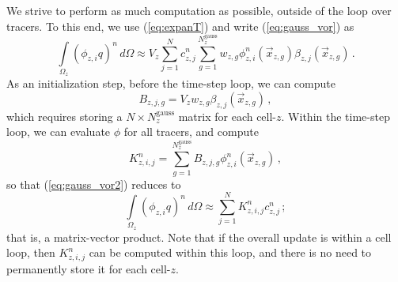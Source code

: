 \documentclass[11pt]{report}
\newcommand{\svec}[1]{{\Vec{#1}}}
\begin{document}
We strive to perform as much computation as possible, outside of the loop
over tracers.  To this end, we use (\ref{eq:expanT}) and write
(\ref{eq:gauss_vor}) as
\begin{equation}
  \label{eq:gauss_vor2}
  \int\limits_{\Omega_z} (\phi_{z,i} q)^{n} \, d\Omega \approx 
     V_z \sum_{j=1}^N c^n_{z,j} \sum_{g=1}^{N^{\mathrm{gauss}}_z}
       w_{z,g} \phi^n_{z,i}(\svec{x}_{z,g})
       \beta_{z,j}(\svec{x}_{z,g})\,.
\end{equation}
As an initialization step, before the time-step loop, we can compute
\begin{equation}
  \label{eq:bfactor}
  B_{z,j,g} = V_z w_{z,g} \beta_{z,j}(\svec{x}_{z,g})\,,
\end{equation}
which requires storing a $N \times N^{\mathrm{gauss}}_z$ matrix for each
cell-$z$.  Within the time-step loop, we can evaluate $\phi$ for all tracers,
and compute
\begin{equation}
  \label{eq:Kmat}
  K^n_{z,i,j} = \sum_{g=1}^{N^{\mathrm{gauss}}_z} B_{z,j,g} \phi^n_{z,i}(\svec{x}_{z,g})\,,
\end{equation}
so that (\ref{eq:gauss_vor2}) reduces to
\begin{equation}
  \label{eq:gauss_vor3}
  \int\limits_{\Omega_z} (\phi_{z,i} q)^{n} \, d\Omega \approx 
     \sum_{j=1}^N K^n_{z,i,j} c^n_{z,j} \,;
\end{equation}
that is, a matrix-vector product.  Note that if the overall update is within a cell loop, then $K^n_{z,i,j}$ can
be computed within this loop, and there is no need to permanently store it for
each cell-$z$.
\end{document}
